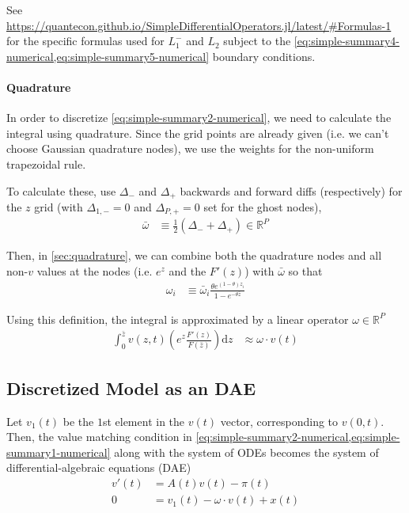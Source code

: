 \documentclass[11pt]{article}
\newcommand{\R}{\ensuremath{\mathbb{R}}}
\newcommand{\diff}{\ensuremath{\mathrm{d}}}
\begin{document}
See \url{https://quantecon.github.io/SimpleDifferentialOperators.jl/latest/#Formulas-1} for the specific formulas used for $L_1^-$ and $L_2$ subject to the \cref{eq:simple-summary4-numerical,eq:simple-summary5-numerical} boundary conditions.

\paragraph{Quadrature}
In order to discretize \cref{eq:simple-summary2-numerical}, we need to calculate the integral using quadrature.  Since the grid points are already given (i.e. we can't choose Gaussian quadrature nodes), we use the weights for the non-uniform trapezoidal rule.

To calculate these, use $\Delta_{-}$ and $\Delta_{+}$ backwards and forward diffs (respectively) for the $z$ grid (with $\Delta_{1,-} = 0$ and $\Delta_{P,+} = 0$ set for the ghost nodes),
\begin{align}
\bar{\omega}&\equiv \frac1{2}(\Delta_{-} + \Delta_{+})\in \R^P
\end{align}

Then, in \cref{sec:quadrature}, we can combine both the quadrature nodes and all non-$v$ values at the nodes (i.e. $e^z$ and the $F'(z)$) with $\bar{\omega}$ so that
\begin{align}
\omega_i &\equiv \bar{\omega}_i \frac{\theta e^{(1 - \theta)z_i}}{1 - e^{-\theta \bar{z}}}
\end{align}

\noindent Using this definition, the integral is approximated by a linear operator $\omega\in\R^P$
\begin{align}
 \int_{0}^{\bar{z}}  v(z,t) \left(e^z \frac{F'(z)}{F(\bar{z})}\right) \diff z &\approx \omega \cdot v(t)
\end{align}

\subsection{Discretized Model as an DAE}
Let $v_1(t)$ be the $1$st element in the $v(t)$ vector, corresponding to $v(0,t)$.  Then, the value matching condition in \cref{eq:simple-summary2-numerical,eq:simple-summary1-numerical} along with the system of ODEs becomes the system of differential-algebraic equations (DAE)
\begin{align}
	v'(t) &= A(t) v(t) - \pi(t)\label{eq:discretized-simple}\\
	0 &= v_1(t) - \omega \cdot v(t) + x(t)\label{eq:discretized-simple-vm}
\end{align}
\end{document}
